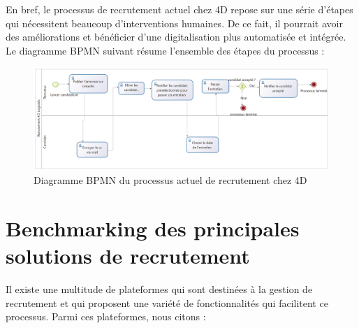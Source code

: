 En bref, le processus de recrutement actuel chez 4D repose sur une série d’étapes qui
nécessitent beaucoup d’interventions humaines. De ce fait, il pourrait avoir des améliorations et bénéficier d’une digitalisation plus automatisée et intégrée. Le diagramme BPMN
suivant résume l’ensemble des étapes du processus :

\begin{figure}[h]
   \centering
   \includegraphics[scale=0.3]{Images/BPMN1.png} 
   \caption{Diagramme BPMN du processus actuel de recrutement chez 4D}
   \label{fig:BPMN1}
\end{figure}





\section{Benchmarking des principales solutions de recrutement}
Il existe une multitude de plateformes qui sont destinées à la gestion de recrutement
et qui proposent une variété de fonctionnalités qui facilitent ce processus. Parmi ces plateformes, nous citons :

